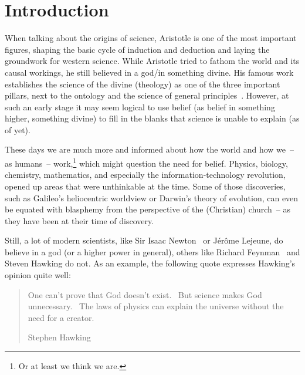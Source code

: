 \section{Introduction}

When talking about the origins of science, Aristotle is one of the most important figures, shaping the basic cycle of induction and deduction and laying the groundwork for western science.
While Aristotle tried to fathom the world and its causal workings, he still believed in a god/in something divine.
His famous work  establishes the science of the divine (theology) as one of the three important pillars, next to the ontology and the science of general principles~\cite{aristotle350}.
However, at such an early stage it may seem logical to use belief (as belief in something higher, something divine) to fill in the blanks that science is unable to explain (as of yet).

%
These days we are much more  and informed about how the world and how we~-- as humans~-- work,\footnote{Or at least we think we are.} which might question the need for belief.
Physics, biology, chemistry, mathematics, and especially the information-technology revolution, opened up areas that were unthinkable at the time.
Some of those discoveries, such as Galileo's heliocentric worldview or Darwin's theory of evolution, can even be equated with blasphemy from the perspective of the (Christian) church~-- as they have been at their time of discovery.

Still, a lot of modern scientists, like Sir Isaac Newton~\cite[p.~315]{westfall1983} or Jérôme Lejeune, do believe in a god (or a higher power in general), others like Richard Feynman~\cite{feynman2001,brian2001} and Steven Hawking do not.
As an example, the following quote expresses Hawking's opinion quite well:
\blockquote[Stephen Hawking]{One can't prove that God doesn't exist. \quoteshorten\ But science makes God unnecessary. \quoteshorten\ The laws of physics can explain the universe without the need for a creator.}

